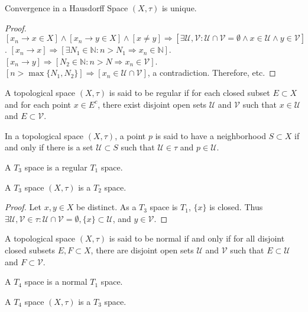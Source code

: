 \documentclass[crop=false,class=book]{standalone}
\begin{document}
\begin{theorem}
Convergence in a Hausdorff Space $(X,\tau)$ is unique.
\end{theorem}
\begin{proof}
$[x_n \rightarrow x\in X]\land [x_n \rightarrow y\in X]\land[x\ne y]\Rightarrow [\exists \mathcal{U},\mathcal{V}:\mathcal{U}\cap \mathcal{V}=\emptyset\land x\in \mathcal{U}\land y\in \mathcal{V}]$. $[x_n\rightarrow x]\Rightarrow [\exists N_1\in \mathbb{N}:n>N_1\Rightarrow x_n \in \mathbb{N}]$. $[x_n\rightarrow y]\Rightarrow [N_2\in \mathbb{N}:n>N\Rightarrow x_n \in \mathcal{V}]$. $[n>\max\{N_1,N_2\}]\Rightarrow [x_n \in \mathcal{U}\cap \mathcal{V}]$, a contradiction. Therefore, etc.
\end{proof}
\begin{definition}
A topological space $(X,\tau)$ is said to be regular if for each closed subset $E\subset X$ and for each point $x\in E^c$, there exist disjoint open sets $\mathcal{U}$ and $\mathcal{V}$ such that $x\in \mathcal{U}$ and $E\subset \mathcal{V}$.
\end{definition} 
\begin{definition}
In a topological space $(X,\tau)$, a point $p$ is said to have a neighborhood $S\subset X$ if and only if there is a set $\mathcal{U}\subset S$ such that $\mathcal{U}\in \tau$ and $p\in \mathcal{U}$.
\end{definition}
\begin{definition}
A $T_3$ space is a regular $T_1$ space.
\end{definition}
\begin{theorem}
A $T_3$ space $(X,\tau)$ is a $T_2$ space.
\end{theorem}
\begin{proof}
Let $x,y\in X$ be distinct. As a $T_3$ space is $T_1$, $\{x\}$ is closed. Thus $\exists \mathcal{U},\mathcal{V}\in\tau: \mathcal{U}\cap\mathcal{V}=\emptyset, \{x\}\subset \mathcal{U}$, and $y\in \mathcal{V}$.
\end{proof}
\begin{definition}
A topological space $(X,\tau)$ is said to be normal if and only if for all disjoint closed subsets $E,F\subset X$, there are disjoint open sets $\mathcal{U}$ and $\mathcal{V}$ such that $E\subset \mathcal{U}$ and $F\subset \mathcal{V}$.
\end{definition}
\begin{definition}
A $T_4$ space is a normal $T_1$ space.
\end{definition}
\begin{theorem}
A $T_4$ space $(X,\tau)$ is a $T_3$ space.
\end{theorem}
\end{document}
